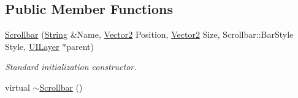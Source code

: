 \subsection*{Public Member Functions}
\begin{DoxyCompactItemize}
\item 
\hyperlink{classphys_1_1UI_1_1Scrollbar_a7b095ad5be09dab381c3bd57dd4cb1e4}{Scrollbar} (\hyperlink{namespacephys_aa03900411993de7fbfec4789bc1d392e}{String} \&Name, \hyperlink{classphys_1_1Vector2}{Vector2} Position, \hyperlink{classphys_1_1Vector2}{Vector2} Size, Scrollbar::BarStyle Style, \hyperlink{classphys_1_1UILayer}{UILayer} $\ast$parent)
\begin{DoxyCompactList}\small\item\em Standard initialization constructor. \item\end{DoxyCompactList}\item 
\hypertarget{classphys_1_1UI_1_1Scrollbar_af9fb189c7856353a930c0a228fc0cf42}{
virtual \hyperlink{classphys_1_1UI_1_1Scrollbar_af9fb189c7856353a930c0a228fc0cf42}{$\sim$Scrollbar} ()}
\label{d0/d3e/classphys_1_1UI_1_1Scrollbar_af9fb189c7856353a930c0a228fc0cf42}


\end{DoxyCompactItemize}
